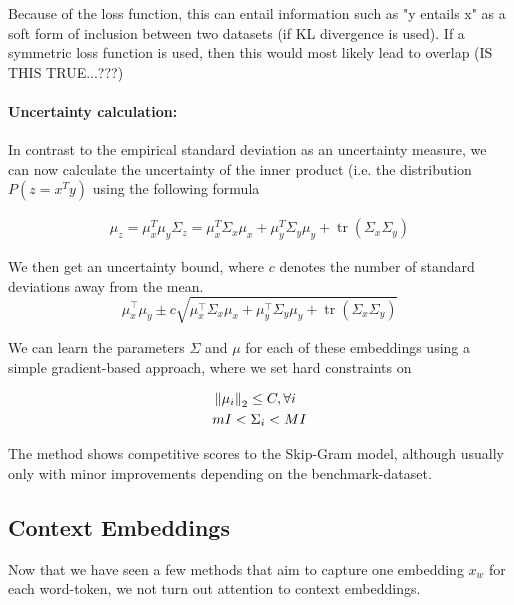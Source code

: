 \documentclass[a4paper,12pt,twoside,openright]{report}
\begin{document}
Because of the loss function, this can entail information such as "y entails x" as a soft form of inclusion between two datasets (if KL divergence is used).
If a symmetric loss function is used, then this would most likely lead to overlap (IS THIS TRUE...???)


\paragraph{Uncertainty calculation:} In contrast to the empirical standard deviation as an uncertainty measure, we can now calculate the uncertainty of the inner product (i.e. the distribution $P(z=x^T y)$ using the following formula

\begin{align}
\mu_z = \mu_x^T \mu_y
\Sigma_z = \mu_{x}^T \Sigma_{x} \mu_{x}+\mu_{y}^T \Sigma_{y} \mu_{y}+\operatorname{tr}\left(\Sigma_{x} \Sigma_{y}\right)
\end{align}

We then get an uncertainty bound, where $c$ denotes the number of standard deviations away from the mean.
\begin{equation}
\mu_{x}^{\top} \mu_{y} \pm c \sqrt{\mu_{x}^{\top} \Sigma_{x} \mu_{x}+\mu_{y}^{\top} \Sigma_{y} \mu_{y}+\operatorname{tr}\left(\Sigma_{x} \Sigma_{y}\right)}
\end{equation}

We can learn the parameters $\Sigma$ and $\mu$ for each of these embeddings using a simple gradient-based approach, where we set hard constraints on 

\begin{align}
& \left\lVert \mu_i \right\rVert_2  \leq C, \forall i \\
& m I <  \Sigma_i < M I
\end{align}

The method shows competitive scores to the Skip-Gram model, although usually only with minor improvements depending on the benchmark-dataset.


\newpage
\subsection{Context Embeddings}

Now that we have seen a few methods that aim to capture one embedding $x_w$ for each word-token, we not turn out attention to context embeddings.
\end{document}
